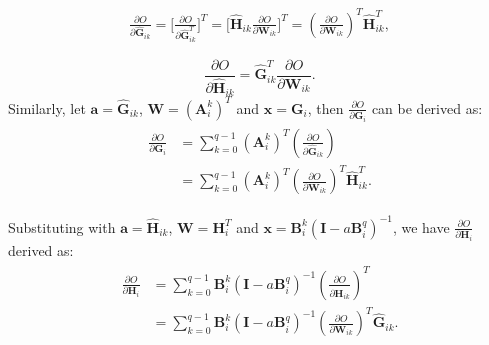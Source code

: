 \documentclass{article}
\begin{document}
\begin{equation}
\label{efc4}
\begin{split}
\frac{\partial O}{\partial \mathbf{\hat{G}}_{ik}}
= \big[ \frac{\partial O}{\partial \mathbf{\hat{G}}_{ik}^T} \big]^T
= \big[ \mathbf{\hat{H}}_{ik} \frac{\partial O}{\partial \mathbf{W}_{ik}} \big]^T
= (\frac{\partial O}{\partial \mathbf{W}_{ik}})^T \mathbf{\hat{H}}_{ik}^T,
\end{split}
\end{equation}


\begin{equation}
\label{efc6}
\frac{\partial O}{\partial \mathbf{\hat{H}}_{ik}}
= \mathbf{\hat{G}}_{ik}^T \frac{\partial O}{\partial \mathbf{W}_{ik}}.
\end{equation}
Similarly, let $\mathbf{a}=\mathbf{\hat{G}}_{ik}$, $\mathbf{W}=(\mathbf{A}_i^k)^T$ and $\mathbf{x}=\mathbf{G}_i$, then $\frac{\partial O}{\partial \mathbf{G}_i} $ can be derived as:
\begin{align}
\label{efc5}
\begin{split}
\frac{\partial O}{\partial \mathbf{G}_i}
&= \sum_{k=0}^{q-1} (\mathbf{A}_i^k)^T (\frac{\partial O}{\partial \mathbf{\hat{G}}_{ik}})   \\
&= \sum_{k=0}^{q-1} (\mathbf{A}_i^k)^T (\frac{\partial O}{\partial \mathbf{W}_{ik}})^T \mathbf{\hat{H}}_{ik}^T.
\end{split}
\end{align}

Substituting with $\mathbf{a}=\mathbf{\hat{H}}_{ik}$, $\mathbf{W}=\mathbf{H}_i^T$ and $\mathbf{x}=\mathbf{B}_i^k(\mathbf{I} - a\mathbf{B}_i^q)^{-1}$, we have $\frac{\partial O}{\partial \mathbf{H}_i} $ derived as:
\begin{align}
\label{efc7}
\begin{split}
\frac{\partial O}{\partial \mathbf{H}_i}
&= \sum_{k=0}^{q-1} \mathbf{B}_i^k(\mathbf{I} - a\mathbf{B}_i^q)^{-1} (\frac{\partial O}{\partial \mathbf{\hat{H}}_{ik}})^T\\
&= \sum_{k=0}^{q-1} \mathbf{B}_i^k(\mathbf{I} - a\mathbf{B}_i^q)^{-1} (\frac{\partial O}{\partial \mathbf{W}_{ik}})^T \mathbf{\hat{G}}_{ik}.
\end{split}
\end{align}
\end{document}
